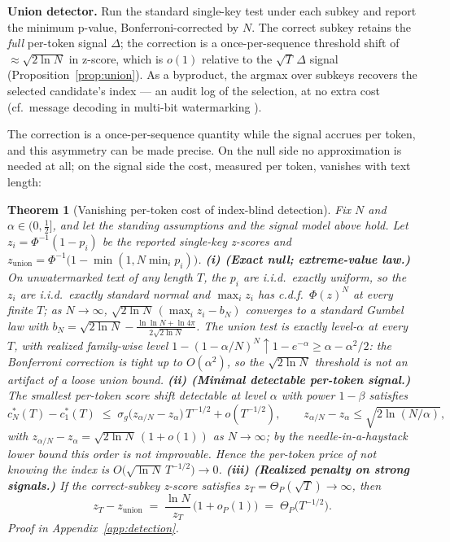 \documentclass{article} %
\newtheorem{theorem}{Theorem}
\begin{document}
\textbf{Union detector.} Run the standard single-key test under each subkey and
report the minimum p-value, Bonferroni-corrected by $N$. The correct subkey
retains the \emph{full} per-token signal $\Delta$; the correction is a
once-per-sequence threshold shift of $\approx\sqrt{2\ln N}$ in z-score, which is
$o(1)$ relative to the $\sqrt{T}\,\Delta$ signal
(Proposition~\ref{prop:union}). As a byproduct, the argmax over subkeys recovers
the selected candidate's index --- an audit log of the selection, at no extra cost
(cf.\ message decoding in multi-bit watermarking \citealp{fernandez2023three}).

The correction is a once-per-sequence quantity while the signal accrues per
token, and this asymmetry can be made precise. On the null side no
approximation is needed at all; on the signal side the cost, measured per
token, vanishes with text length:

\begin{theorem}[Vanishing per-token cost of index-blind detection]\label{thm:vanish}
Fix $N$ and $\alpha\in(0,\tfrac12]$, and let the standing assumptions and
the signal model above hold. Let $z_i=\Phi^{-1}(1-p_i)$ be the reported
single-key z-scores and $z_{\mathrm{union}}=\Phi^{-1}\!\big(1-\min(1,N\min_i p_i)\big)$.
\textbf{(i) (Exact null; extreme-value law.)} On unwatermarked text of
\emph{any} length $T$, the $p_i$ are i.i.d.\ exactly uniform, so the $z_i$
are i.i.d.\ exactly standard normal and $\max_i z_i$ has c.d.f.\
$\Phi(z)^N$ at every finite $T$; as $N\to\infty$,
$\sqrt{2\ln N}\,(\max_i z_i-b_N)$ converges to a standard Gumbel law with
$b_N=\sqrt{2\ln N}-\tfrac{\ln\ln N+\ln4\pi}{2\sqrt{2\ln N}}$. The union
test is exactly level-$\alpha$ at every $T$, with realized family-wise level
$1-(1-\alpha/N)^N\uparrow1-e^{-\alpha}\ge\alpha-\alpha^2/2$: the
Bonferroni correction is tight up to $O(\alpha^2)$, so the $\sqrt{2\ln N}$
threshold is not an artifact of a loose union bound.
\textbf{(ii) (Minimal detectable per-token signal.)} The smallest per-token
score shift detectable at level $\alpha$ with power $1-\beta$ satisfies
\[
c^*_N(T)-c^*_1(T)\;\le\;\sigma_g\big(z_{\alpha/N}-z_\alpha\big)\,T^{-1/2}+o(T^{-1/2}),
\qquad z_{\alpha/N}-z_\alpha\le\sqrt{2\ln(N/\alpha)},
\]
with $z_{\alpha/N}-z_\alpha=\sqrt{2\ln N}\,(1+o(1))$ as $N\to\infty$; by
the needle-in-a-haystack lower bound this order is not improvable. Hence the
per-token price of not knowing the index is $O\big(\sqrt{\ln N}\,T^{-1/2}\big)\to0$.
\textbf{(iii) (Realized penalty on strong signals.)} If the correct-subkey
z-score satisfies $z_T=\Theta_P(\sqrt T)\to\infty$, then
\[
z_T-z_{\mathrm{union}}\;=\;\frac{\ln N}{z_T}\,\big(1+o_P(1)\big)\;=\;\Theta_P\big(T^{-1/2}\big).
\]
Proof in Appendix~\ref{app:detection}.
\end{theorem}
\end{document}
